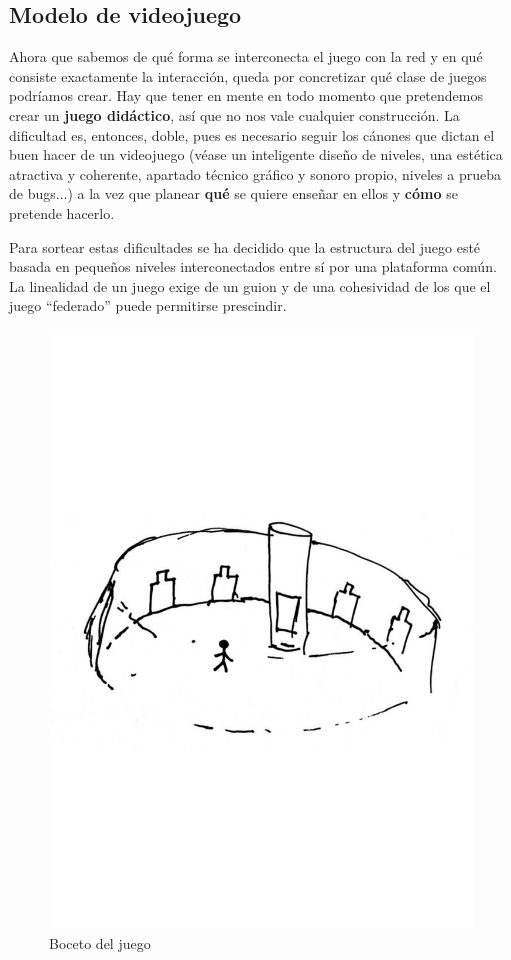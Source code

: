 \subsection{Modelo de videojuego}\label{subsec:modelojuego}
Ahora que sabemos de qué forma se interconecta el juego con la red y en qué consiste exactamente la interacción, queda por concretizar qué clase de juegos podríamos crear. Hay que tener en mente en todo momento que pretendemos crear un \textbf{juego didáctico}, así que no nos vale cualquier construcción. La dificultad es, entonces, doble, pues es necesario seguir los cánones que dictan el buen hacer de un videojuego (véase un inteligente diseño de niveles, una estética atractiva y coherente, apartado técnico gráfico y sonoro propio, niveles a prueba de bugs...) a la vez que planear \textbf{qué} se quiere enseñar en ellos y \textbf{cómo} se pretende hacerlo.

Para sortear estas dificultades se ha decidido que la estructura del juego esté basada en pequeños niveles interconectados entre sí por una plataforma común. La linealidad de un juego exige de un guion y de una cohesividad de los que el juego ``federado'' puede permitirse  prescindir.

\begin{figure}[H]
  \centering
  \includegraphics[scale=0.35, trim={0 9cm 0 9cm}]{imagenes/hall_juego}
  \caption{Boceto del juego}
  \label{fig:hall}
\end{figure}

